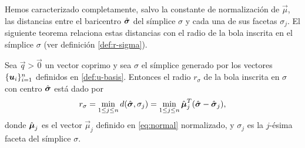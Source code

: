 Hemos caracterizado completamente, salvo la constante de normalización de $\vec{\mu}$, las
distancias entre el baricentro $\hat{\boldsymbol{ \sigma }}$ del símplice $\sigma$ y cada una de sus facetas
$\sigma_j$. El siguiente teorema relaciona estas distancias con el radio de la bola inscrita en el
símplice $\sigma$ (ver definición \ref{def:r-sigma}).
\begin{theorem}
	\label{lemma:sigma-radius}
	Sea $\vec{q} > \vec{0}$ un vector coprimo y sea $\sigma$ el símplice generado por los vectores
	$\lbrace \boldsymbol{u}_i \rbrace_{i=1}^{n}$ definidos en \eqref{def:u-basis}. Entonces el radio $r_\sigma$ de
	la bola inscrita en $\sigma$ con centro $\hat{\boldsymbol{ \sigma }}$ está dado por
	\begin{equation*}
		r_\sigma = \min_{1 \leq j \leq n} d(\hat{\boldsymbol{ \sigma }}, \sigma_j)
		= \min_{1 \leq j \leq n} \hat{\boldsymbol{\mu}}_j^T(\hat{\boldsymbol{ \sigma }} - \hat{\boldsymbol{ \sigma }}_j),
	\end{equation*}
	donde $\hat{\boldsymbol{\mu}}_j$ es el vector $\vec{\mu}_j$ definido en \eqref{eq:normal} normalizado, y
	$\sigma_j$ es la $j$-ésima faceta del símplice $\sigma$.
\end{theorem}
